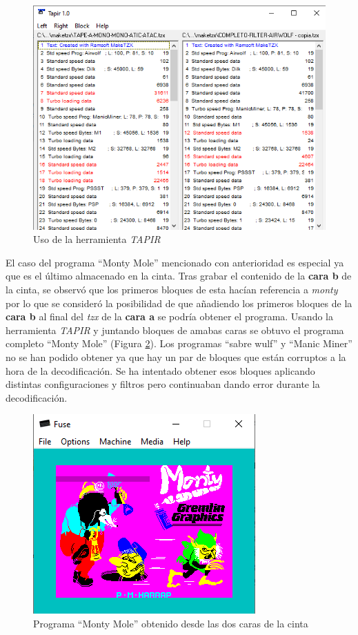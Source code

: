\documentclass{article}
\begin{document}
\begin{figure}[h!]
    \centering
    \includegraphics[scale=0.6]{images/tapir.png}
    \caption{Uso de la herramienta \textit{TAPIR}}
    \label{fig:tapir}
\end{figure}

El caso del programa ``Monty Mole'' mencionado con anterioridad es especial ya que es el último almacenado en la cinta. Tras grabar el contenido de la \textbf{cara b} de la cinta, se observó que los primeros bloques de esta hacían referencia a \textit{monty} por lo que se consideró la posibilidad de que añadiendo los primeros bloques de la \textbf{cara b} al final del \textit{tzx} de la \textbf{cara a} se podría obtener el programa. Usando la herramienta \textit{TAPIR} y juntando bloques de amabas caras se obtuvo el programa completo ``Monty Mole'' (Figura \ref{fig:montyMole}). Los programas ``sabre wulf'' y ``Manic Miner'' no se han podido obtener ya que hay un par de bloques que están corruptos a la hora de la decodificación. Se ha intentado obtener esos bloques aplicando distintas configuraciones y filtros pero continuaban dando error durante la decodificación.\\

\begin{figure}[h!]
    \centering
    \includegraphics[scale=0.6]{images/monty-mole.png}
    \caption{Programa ``Monty Mole'' obtenido desde las dos caras de la cinta}
    \label{fig:montyMole}
\end{figure}
\end{document}
